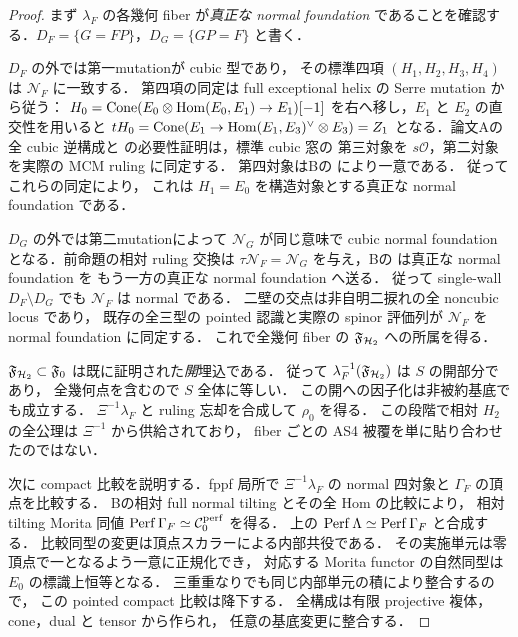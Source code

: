 \begin{proof}
まず $\lambda_F$ の各幾何 fiber が\emph{真正な normal foundation}
であることを確認する．$D_F=\{G=FP\}$，$D_G=\{GP=F\}$ と書く．

$D_F$ の外では第一mutationが cubic 型であり，
その標準四項 $(H_1,H_2,H_3,H_4)$ は $\mathcal N_F$ に一致する．
第四項の同定は full exceptional helix の Serre mutation から従う：
$H_0=\operatorname{Cone}(E_0\otimes\operatorname{Hom}(E_0,E_1)\to E_1)[-1]$
を右へ移し，$E_1$ と $E_2$ の直交性を用いると
$tH_0=\operatorname{Cone}(E_1\to\operatorname{Hom}(E_1,E_3)^\vee\otimes E_3)=Z_1$
となる．論文Aの全 cubic 逆構成と
\cite[\texttt{thm:all-admissible-inverse},\texttt{thm:cubic-coverage}]{QuadricIntrinsic2026} の必要性証明は，標準 cubic 窓の
第三対象を $s\mathcal O$，第二対象を実際の MCM ruling に同定する．
第四対象はBの \cite[\texttt{cor:two-intrinsic-foundations}]{QuadricModuli2026} により一意である．
従ってこれらの同定により，
これは $H_1=E_0$ を構造対象とする真正な normal foundation である．

$D_G$ の外では第二mutationによって $\mathcal N_G$ が同じ意味で
cubic normal foundation となる．前命題の相対 ruling 交換は
$\tau\mathcal N_F=\mathcal N_G$ を与え，Bの
\cite[\texttt{prop:ruling-involution-mutation}]{QuadricModuli2026} は真正な normal foundation を
もう一方の真正な normal foundation へ送る．
従って single-wall $D_F\setminus D_G$ でも $\mathcal N_F$ は normal である．
二壁の交点は非自明二捩れの全 noncubic locus であり，
既存の全三型の pointed 認識と実際の spinor 評価列が
$\mathcal N_F$ を normal foundation に同定する．
これで全幾何 fiber の $\mathfrak F_{\mathcal H_2}$ への所属を得る．

$\mathfrak F_{\mathcal H_2}\subset\mathfrak F_0$ は既に証明された\emph{開}埋込である．
従って $\lambda_F^{-1}(\mathfrak F_{\mathcal H_2})$ は $S$ の開部分であり，
全幾何点を含むので $S$ 全体に等しい．
この開への因子化は非被約基底でも成立する．
$\Xi^{-1}\lambda_F$ と ruling 忘却を合成して $\rho_0$ を得る．
この段階で相対 $H_2$ の全公理は $\Xi^{-1}$ から供給されており，
fiber ごとの AS4 被覆を単に貼り合わせたのではない．

次に compact 比較を説明する．fppf 局所で $\Xi^{-1}\lambda_F$ の
normal 四対象と $\Gamma_F$ の頂点を比較する．
Bの相対 full normal tilting とその全 Hom の比較により，
相対 tilting Morita 同値 $\operatorname{Perf}\Gamma_F\simeq\mathcal C_0^{\mathrm{perf}}$ を得る．
上の $\operatorname{Perf}\Lambda\simeq\operatorname{Perf}\Gamma_F$ と合成する．
比較同型の変更は頂点スカラーによる内部共役である．
その実施単元は零頂点で一となるよう一意に正規化でき，
対応する Morita functor の自然同型は $E_0$ の標識上恒等となる．
三重重なりでも同じ内部単元の積により整合するので，
この pointed compact 比較は降下する．
全構成は有限 projective 複体，cone，dual と tensor から作られ，
任意の基底変更に整合する．


\end{proof}
